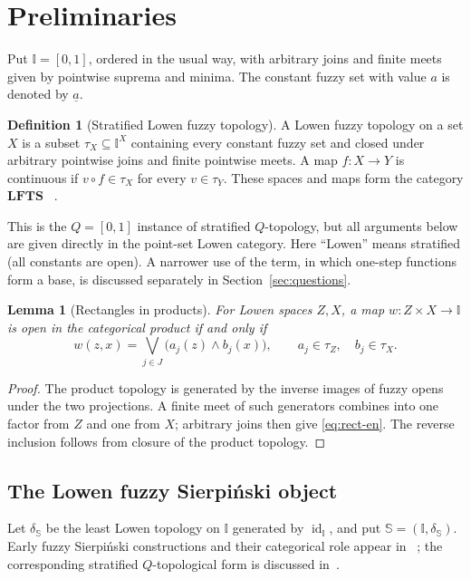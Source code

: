 \documentclass[11pt,a4paper]{article}
\numberwithin{equation}{section}
\newtheorem{lemma}[theorem]{Lemma}
\theoremstyle{definition}
\newtheorem{definition}[theorem]{Definition}
\theoremstyle{remark}
\newcommand{\I}{\mathbb I}
\newcommand{\Sier}{\mathbb S}
\newcommand{\LFTS}{\mathbf{LFTS}}
\newcommand{\const}[1]{\underline{#1}}
\newcommand{\id}{\operatorname{id}}
\begin{document}
\section{Preliminaries}

Put \(\I=[0,1]\), ordered in the usual way, with arbitrary joins and
finite meets given by pointwise suprema and minima.  The constant fuzzy
set with value \(a\) is denoted by \(\const a\).

\begin{definition}[Stratified Lowen fuzzy topology]
A Lowen fuzzy topology on a set \(X\) is a subset
\(\tau_X\subseteq\I^X\) containing every constant fuzzy set and closed
under arbitrary pointwise joins and finite pointwise meets.  A map
\(f:X\to Y\) is continuous if \(v\circ f\in\tau_X\) for every
\(v\in\tau_Y\).  These spaces and maps form the category \(\LFTS\)
~\cite{Lowen1976-en,LiuZhangLuo2000-en}.
\end{definition}

This is the \(Q=[0,1]\) instance of stratified \(Q\)-topology, but all
arguments below are given directly in the point-set Lowen category.
Here ``Lowen'' means stratified (all constants are open).  A narrower
use of the term, in which one-step functions form a base, is discussed
separately in Section~\ref{sec:questions}.

\begin{lemma}[Rectangles in products]\label{lem:rect-en}
For Lowen spaces \(Z,X\), a map \(w:Z\times X\to\I\) is open in the
categorical product if and only if
\begin{equation}\label{eq:rect-en}
 w(z,x)=\bigvee_{j\in J}\bigl(a_j(z)\wedge b_j(x)\bigr),
 \qquad a_j\in\tau_Z,\quad b_j\in\tau_X.
\end{equation}
\end{lemma}

\begin{proof}
The product topology is generated by the inverse images of fuzzy opens
under the two projections.  A finite meet of such generators combines
into one factor from \(Z\) and one from \(X\); arbitrary joins then give
\eqref{eq:rect-en}.  The reverse inclusion follows from closure of the
product topology.
\end{proof}

\subsection{The Lowen fuzzy Sierpiński object}

Let \(\delta_{\Sier}\) be the least Lowen topology on \(\I\) generated
by \(\id_{\I}\), and put \(\Sier=(\I,\delta_{\Sier})\).  Early fuzzy
Sierpiński constructions and their categorical role appear in
~\cite{Srivastava1984-en,SrivastavaSrivastava1986-en,
LowenSrivastava1988-en}; the corresponding stratified \(Q\)-topological
form is discussed in~\cite{TiwariSrivastava2022-en}.
\end{document}
